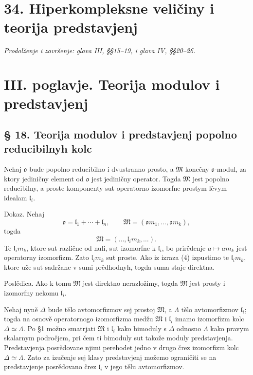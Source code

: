 \documentclass[11pt]{article}
\providecommand{\mo}{\mathfrak{o}}
\providecommand{\ml}{\mathfrak{l}}
\providecommand{\mM}{\mathfrak{M}}
\begin{document}
\section*{34. Hiperkompleksne veličiny i teorija predstavjenj}
\emph{Prodolženje i završenje: glava III, §§15--19, i glava IV, §§20--26.}

\section*{III. poglavje. Teorija modulov i predstavjenj}

\subsection*{§ 18. Teorija modulov i predstavjenj popolno reducibilnyh kolc}

Nehaj $\mo$ bude popolno reducibilno i dvustranno prosto, a $\mM$ konečny $\mo$-modul, za ktory jediničny element od $\mo$ jest jediničny operator. Togda $\mM$ jest popolno reducibilny, a proste komponenty sut operatorno izomorfne prostym lěvym idealam $\ml_i$.

Dokaz. Nehaj
\[
        \mo=\ml_1+\cdots+\ml_n,
        \qquad
        \mM=(\mo m_1,\ldots,\mo m_k),
\]
togda
\[
        \mM=(\ldots,\ml_i m_k,\ldots).                     \tag{4}
\]
Te $\ml_i m_k$, ktore sut različne od nuli, sut izomorfne k $\ml_i$, bo prirěđenje $a\mapsto am_k$ jest operatorny izomorfizm. Zato $\ml_i m_k$ sut proste. Ako iz izraza (4) izpustimo te $\ml_i m_k$, ktore uže sut sadržane v sumi prědhodnyh, togda suma staje direktna.

Poslědica. Ako k tomu $\mM$ jest direktno nerazložimy, togda $\mM$ jest prosty i izomorfny nekomu $\ml_i$.

Nehaj nyně $\Delta$ bude tělo avtomorfizmov sej prostoj $\mM$, a $\Lambda$ tělo avtomorfizmov $\ml_i$; togda na osnově operatornogo izomorfizma medžu $\mM$ i $\ml_i$ imamo izomorfizm kolc $\Delta\simeq\Lambda$. Po §1 možno smatrjati $\mM$ i $\ml_i$ kako bimoduly s $\Delta$ odnosno $\Lambda$ kako pravym skalarnym področjem, pri čem ti bimoduly sut takože moduly predstavjenja. Predstavjenja posrědovane njimi perehodet jedno v drugo črez izomorfizm kolc $\Delta\simeq\Lambda$. Zato za izučenje sej klasy predstavjenj možemo ograničiti se na predstavjenje posrědovano črez $\ml_i$ v jego tělu avtomorfizmov.
\end{document}
